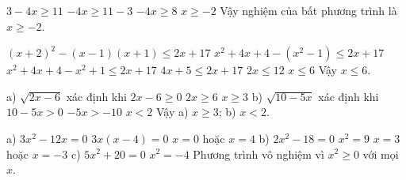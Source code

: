 \begin{problem}[9DS-BPT-002]
$3 - 4x \geq 11$
$-4x \geq 11 - 3$
$-4x \geq 8$
$x \geq -2$
Vậy nghiệm của bất phương trình là $x \geq -2$.
\end{problem}

\begin{problem}[9DS-BPT-003]
$(x + 2)^2 - (x - 1)(x + 1) \leq 2x + 17$
$x^2 + 4x + 4 - (x^2 - 1) \leq 2x + 17$
$x^2 + 4x + 4 - x^2 + 1 \leq 2x + 17$
$4x + 5 \leq 2x + 17$
$2x \leq 12$
$x \leq 6$
Vậy $x \leq 6$.
\end{problem}

\begin{problem}[9DS-CAN-001]
a) $\sqrt{2x - 6}$ xác định khi $2x - 6 \geq 0$
$2x \geq 6$
$x \geq 3$
b) $\sqrt{10 - 5x}$ xác định khi $10 - 5x > 0$
$-5x > -10$
$x < 2$
Vậy a) $x \geq 3$; b) $x < 2$.
\end{problem}

\begin{problem}[9DS-PT2-001]
a) $3x^2 - 12x = 0$
$3x(x - 4) = 0$
$x = 0$ hoặc $x = 4$
b) $2x^2 - 18 = 0$
$x^2 = 9$
$x = 3$ hoặc $x = -3$
c) $5x^2 + 20 = 0$
$x^2 = -4$
Phương trình vô nghiệm vì $x^2 \geq 0$ với mọi $x$.
\end{problem}
